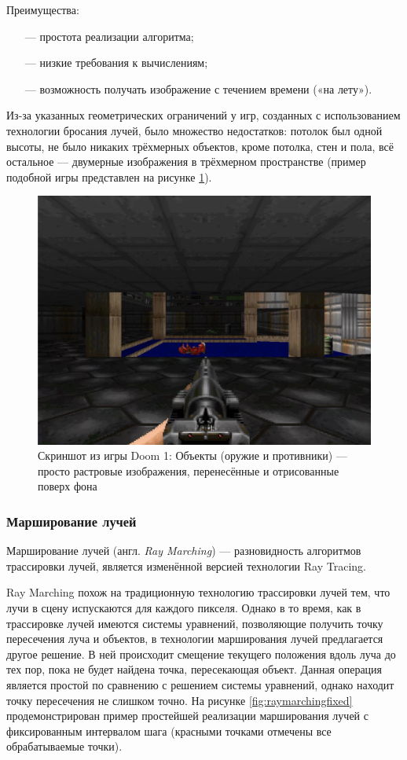 Преимущества:
\begin{itemize}[leftmargin=1.6\parindent]
	\item[---] простота реализации алгоритма;
	\item[---] низкие требования к вычислениям;
	\item[---] возможность получать изображение с течением времени («на лету»).
\end{itemize}

Из-за указанных геометрических ограничений у игр, созданных с 
использованием технологии бросания лучей, было множество недостатков: 
потолок был одной высоты, не было никаких трёхмерных объектов, кроме 
потолка, стен и пола, всё остальное — двумерные изображения в трёхмерном 
пространстве (пример подобной игры представлен на рисунке \ref{fig:doom}).

\begin{figure}[h]
	\centering
	\captionsetup{justification=centering}
	\includegraphics[width=120mm]{img/doom.png}
	\caption{Скриншот из игры Doom 1: Объекты (оружие и противники) --- 
		просто растровые изображения, перенесённые и отрисованные поверх фона}
	\label{fig:doom}
\end{figure}


\subsubsection{Марширование лучей}
Марширование лучей (англ. \textit{Ray Marching}) \cite{raymarching} --- разновидность алгоритмов 
трассировки лучей, является изменённой версией технологии Ray Tracing.

Ray Marching похож на традиционную технологию трассировки лучей 
тем, что лучи в сцену испускаются для каждого пикселя.
Однако в то время, как 
в трассировке лучей имеются системы уравнений, позволяющие получить 
точку пересечения луча и объектов, в технологии марширования лучей 
предлагается другое решение.
В ней происходит смещение текущего положения вдоль луча до тех пор, пока не будет найдена точка, пересекающая 
объект.
Данная операция является простой по сравнению с решением системы 
уравнений, однако находит точку пересечения не слишком точно. 
На рисунке \ref{fig:raymarchingfixed} продемонстрирован пример простейшей реализации марширования лучей с фиксированным интервалом шага (красными точками отмечены все обрабатываемые точки).
\clearpage

